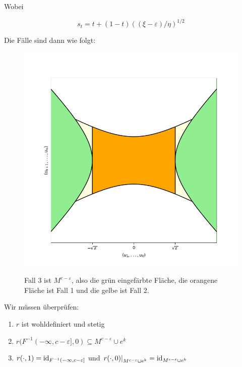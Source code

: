 \begin{bigproof}
\begin{smallproof}
        Wobei 

        \[ s_t = t + (1 -t)((\xi - \varepsilon)/\eta)^{1/2} \]

        Die Fälle sind dann wie folgt:

        \begin{figure}[H]
            \centering
            \includegraphics[width=0.8\linewidth]{../resources/Me-Diagram9-handle-cases.png}
            \label{me-diagram9}
            \caption{
                Fall 3 ist $M^{c - \varepsilon}$, also die grün eingefärbte Fläche, die
                orangene Fläche ist Fall 1 und die gelbe ist Fall 2.
            }
        \end{figure}

        Wir müssen überprüfen:
        \begin{enumerate}
            \item $r$ ist wohldefiniert und stetig
            \item $r(F^{-1}(-\infty, c - \varepsilon], 0) \subseteq M^{c - \varepsilon} \cup e^k$
            \item $r(\cdot, 1) = { \operatorname{id} }_{F^{-1}(-\infty, c - \varepsilon]}$ und 
                $\left. r(\cdot , 0) \right\vert_{M^{c - \varepsilon} \cup e^k} 
                = { \operatorname{id} }_{M^{c - \varepsilon} \cup e^k}$
        \end{enumerate}


\end{smallproof}
\end{bigproof}
